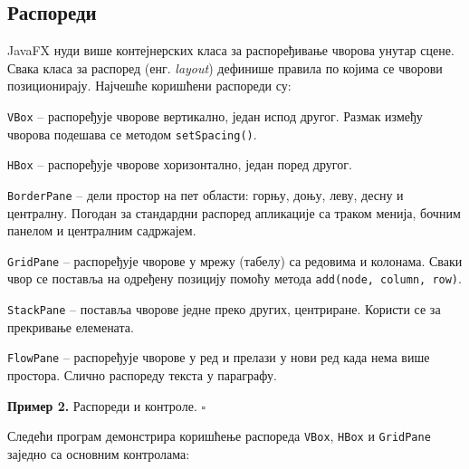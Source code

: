 \subsection{Распореди}

JavaFX нуди више контејнерских класа за распоређивање чворова унутар сцене. Свака класа за распоред (енг. \textit{layout}) дефинише правила по којима се чворови позиционирају. Најчешће коришћени распореди су:

\texttt{VBox} – распоређује чворове вертикално, један испод другог. Размак између чворова подешава се методом \texttt{setSpacing()}.

\texttt{HBox} – распоређује чворове хоризонтално, један поред другог.

\texttt{BorderPane} – дели простор на пет области: горњу, доњу, леву, десну и централну. Погодан за стандардни распоред апликације са траком менија, бочним панелом и централним садржајем.

\texttt{GridPane} – распоређује чворове у мрежу (табелу) са редовима и колонама. Сваки чвор се поставља на одређену позицију помоћу метода \texttt{add(node, column, row)}.

\texttt{StackPane} – поставља чворове једне преко других, центриране. Користи се за прекривање елемената.

\texttt{FlowPane} – распоређује чворове у ред и прелази у нови ред када нема више простора. Слично распореду текста у параграфу.


\bigskip

\noindent \textbf{Пример 2.} Распореди и контроле. $\square$

\medskip

Следећи програм демонстрира коришћење распореда \texttt{VBox}, \texttt{HBox} и \texttt{GridPane} заједно са основним контролама:


